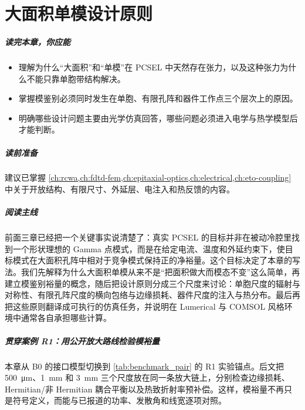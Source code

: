﻿%
\chapter{大面积单模设计原则}
\label{ch:single-mode-design}

\paragraph{读完本章，你应能}
\begin{itemize}
  \item 理解为什么“大面积”和“单模”在 PCSEL 中天然存在张力，以及这种张力为什么不能只靠单胞带结构解决。
  \item 掌握模鉴别必须同时发生在单胞、有限孔阵和器件工作点三个层次上的原因。
  \item 明确哪些设计问题主要由光学仿真回答，哪些问题必须进入电学与热学模型后才能判断。
\end{itemize}

\paragraph{读前准备}
建议已掌握 \cref{ch:rcwa,ch:fdtd-fem,ch:epitaxial-optics,ch:electrical,ch:eto-coupling} 中关于开放结构、有限尺寸、外延层、电注入和热反馈的内容。

\paragraph{阅读主线}
前面三章已经把一个关键事实说清楚了：真实 PCSEL 的目标并非在被动冷腔里找到一个形状理想的 Gamma 点模式，而是在给定电流、温度和外延约束下，使目标模式在大面积孔阵中相对于竞争模式保持正的净裕量。这个目标决定了本章的写法。我们先解释为什么大面积单模从来不是“把面积做大而模态不变”这么简单，再建立模鉴别裕量的概念，随后把设计原则分成三个尺度来讨论：单胞尺度的辐射与对称性、有限孔阵尺度的横向包络与边缘损耗、器件尺度的注入与热分布。最后再把这些原则翻译成可执行的仿真任务，并说明在 Lumerical 与 COMSOL 风格环境中通常各自承担哪些计算。

\paragraph{贯穿案例 R1：用公开放大路线检验模裕量}
本章从 B0 的接口模型切换到 \cref{tab:benchmark_pair} 的 R1 实验锚点。后文把 \SI{500}{\micro\meter}、\SI{1}{mm} 和 \SI{3}{mm} 三个尺度放在同一条放大链上，分别检查边缘损耗、Hermitian/非 Hermitian 耦合平衡以及热致折射率预补偿。这样，模裕量不再只是符号定义，而能与已报道的功率、发散角和线宽逐项对照。

